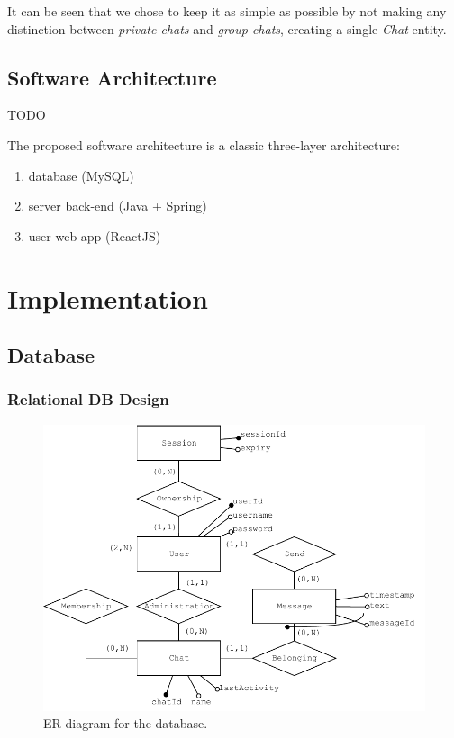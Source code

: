 \documentclass[10pt]{article}
\begin{document}
It can be seen that we chose to keep it as simple as possible by not making  
any distinction between \emph{private chats} and \emph{group chats}, 
creating a single \emph{Chat} entity.

\subsection{Software Architecture}
TODO

The proposed software architecture is a classic three-layer architecture:
\begin{enumerate}
    \item database (MySQL)
    \item server back-end (Java + Spring)
    \item user web app (ReactJS)
\end{enumerate}

\clearpage
\section{Implementation}

\subsection{Database}
\subsubsection{Relational DB Design}
\begin{figure}[]
    \centering
    \includegraphics[width=\textwidth]{figs/ER}
    \caption{ER diagram for the database.}
    \label{fig:er}
\end{figure}
\end{document}
